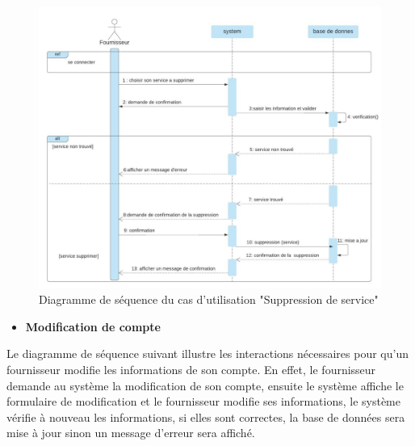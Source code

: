 \documentclass[french]{report}
\begin{document}
\begin{figure}[H]
    \centering
    \includegraphics[width=1\textwidth]{images/sequence diag supp service.jpg}
    \caption{Diagramme de séquence du cas d'utilisation "Suppression de service"}
    \label{fig:my_label}
\end{figure}

\begin{itemize}
    \item \textbf{Modification de compte}
\end{itemize}

Le diagramme de séquence suivant illustre les interactions nécessaires pour
qu'un fournisseur modifie les informations de son compte. En effet, le
fournisseur demande au système la modification de son compte, ensuite le
système affiche le formulaire de modification et le fournisseur modifie ses
informations, le système vérifie à nouveau les informations, si elles sont
correctes, la base de données sera mise à jour sinon un message d'erreur sera
affiché.
\end{document}
